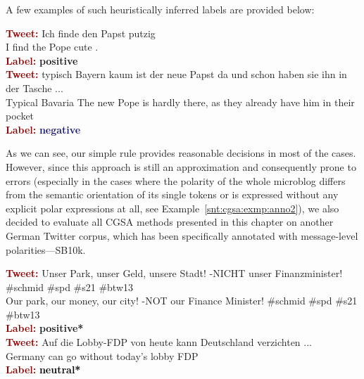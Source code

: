 A few examples of such heuristically inferred labels are provided
below:
\begin{example}\label{snt:cgsa:exmp:anno1}
  \noindent\textup{\bfseries\textcolor{darkred}{Tweet:}} {\upshape Ich finde den Papst putzig \smiley{}}\\
  \noindent I find the Pope cute \smiley{}.\\
  \noindent\textup{\bfseries\textcolor{darkred}{Label:}}\hspace*{2em}\textbf{%
    \upshape\textcolor{green3}{positive}}\\[1.5em]
  \noindent\textup{\bfseries\textcolor{darkred}{Tweet:}} {\upshape typisch Bayern kaum ist der neue Papst da und schon haben
  sie ihn in der Tasche ...}\\
  \noindent Typical Bavaria The new Pope is hardly there, as they already have him in their pocket\\
  \noindent\textup{\bfseries\textcolor{darkred}{Label:}}\hspace*{2em}\textbf{%
    \upshape\textcolor{midnightblue}{negative}}
\end{example}
As we can see, our simple rule provides reasonable decisions in most
of the cases.  However, since this approach is still an approximation
and consequently prone to errors (especially in the cases where the
polarity of the whole microblog differs from the semantic orientation
of its single tokens or is expressed without any explicit polar
expressions at all, see Example~\ref{snt:cgsa:exmp:anno2}), we also
decided to evaluate all CGSA methods presented in this chapter on
another German Twitter corpus, which has been specifically annotated
with message-level polarities---SB10k.

\begin{example}\label{snt:cgsa:exmp:anno2}
  \noindent\textup{\bfseries\textcolor{darkred}{Tweet:}} {\upshape Unser Park, unser Geld, unsere Stadt! -NICHT unser Finanzminister! \smiley{} \#schmid \#spd \#s21 \#btw13}\\
  \noindent Our park, our money, our city! -NOT our Finance Minister! \smiley{} \#schmid \#spd \#s21 \#btw13\\
  \noindent\textup{\bfseries\textcolor{darkred}{Label:}}\hspace*{2em}\textbf{%
    \upshape\textcolor{green3}{positive*}}\\[1.5em]
  \noindent\textup{\bfseries\textcolor{darkred}{Tweet:}} {\upshape Auf die Lobby-FDP von heute kann Deutschland verzichten ...}\\
  \noindent Germany can go without today's lobby FDP\\
  \noindent\textup{\bfseries\textcolor{darkred}{Label:}}\hspace*{2em}\textbf{%
    \upshape\textcolor{black}{neutral*}}
\end{example}

